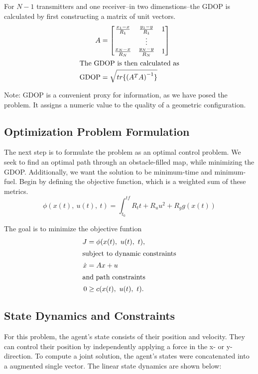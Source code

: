 \documentclass[conference]{IEEEtran}
\begin{document}
For $N-1$ transmitters and one receiver--in two dimenstions--the GDOP is calculated by first constructing a matrix of unit vectors.
\begin{align}
A &= \begin{bmatrix} \frac{x_1 - x}{R_1} & \frac{y_1 - y}{R_1} & 1 \\ & \vdots & \\ \frac{x_N - x}{R_N} & \frac{y_N - y}{R_N} & 1 \\ \end{bmatrix} \\
\intertext{The GDOP is then calculated as}
\text{GDOP} &= \sqrt{tr \{ \left( A^T A\right) ^{-1} \}}
\end{align}

Note: GDOP is a convenient proxy for information, as we have posed the problem. It assigns a numeric value to the quality of a geometric configuration\cite{gdop}.

\subsection{Optimization Problem Formulation}
The next step is to formulate the problem as an optimal control problem. We seek to find an optimal path through an obstacle-filled map, while minimizing the GDOP. Additionally, we want the solution to be minimum-time and minimum-fuel. Begin by defining the objective function, which is a weighted sum of these metrics.
\[ \phi(x(t), ~u(t),~t) = \int_{t_0}^{tf} R_t t + R_{u}u^2 + R_{g} g(x(t))\]

The goal is to minimize the objective funtion
\begin{align}
J &= \phi (x(t),~u(t),~t), \\
\intertext{subject to dynamic constraints}
\dot{x} &= Ax + u\\
\intertext{and path constraints}
0 &\geq c(x(t),~u(t),~t).
\end{align}

\subsection{State Dynamics and Constraints}
For this problem, the agent's state consists of their position and velocity. They can control their position by independently applying a force in the x- or y-direction. To compute a joint solution, the agent's states were concatenated into a augmented single vector. The linear state dynamics are shown below:
\end{document}
